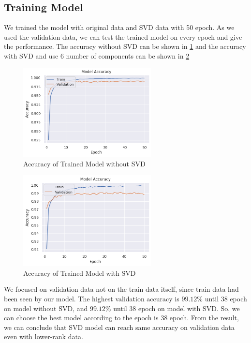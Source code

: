 \documentclass[conference]{IEEEtran}
\begin{document}
\subsection{Training Model}
We trained the model with original data and SVD data with 50 epoch. As we used the validation data, we can test the trained model on every epoch and give the performance.
The accuracy without SVD can be shown in \ref{fig:trained_model_without_SVD} and the accuracy with SVD and use 6 number of components can be shown in \ref{fig:trained_model_with_SVD}
\begin{figure}[htbp]
    \centerline{\includegraphics[width=7cm]{Training_performance_acc.png}}
    \caption{Accuracy of Trained Model without SVD}
    \label{fig:trained_model_without_SVD}
\end{figure}

\begin{figure}[htbp]
    \centerline{\includegraphics[width=7cm]{Training_performance_SVD_acc.png}}
    \caption{Accuracy of Trained Model with SVD}
    \label{fig:trained_model_with_SVD}
\end{figure}
We focused on validation data not on the train data itself, since train data had been seen by our model.
The highest validation accuracy is $99.12 \%$ until 38 epoch on model without SVD, and $99.12 \%$ until 38 epoch on model with SVD. 
So, we can choose the best model according to the epoch is 38 epoch. From the result, we can conclude that SVD model can reach same accuracy on validation data even with lower-rank data.  
\end{document}
